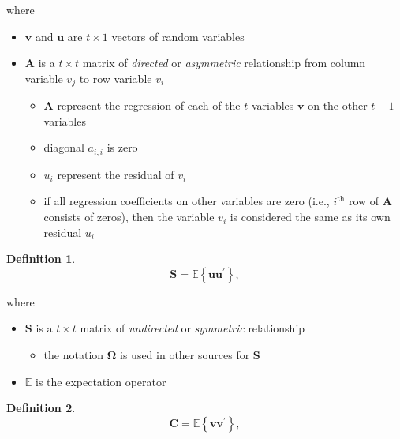 \documentclass[
]{book}
\providecommand{\tightlist}{%
  \setlength{\itemsep}{0pt}\setlength{\parskip}{0pt}}
\theoremstyle{definition}
\newtheorem{definition}{Definition}[chapter]
\theoremstyle{definition}
\theoremstyle{definition}
\theoremstyle{remark}
\begin{document}
\noindent where

\begin{itemize}
\tightlist
\item
  \(\mathbf{v}\) and \(\mathbf{u}\) are \(t \times 1\) vectors of random variables
\item
  \(\mathbf{A}\) is a \(t \times t\) matrix
  of \emph{directed} or \emph{asymmetric} relationship
  from column variable \(v_j\) to row variable \(v_i\)

  \begin{itemize}
  \tightlist
  \item
    \(\mathbf{A}\) represent the regression
    of each of the \(t\) variables \(\mathbf{v}\) on the other \(t - 1\) variables
  \item
    diagonal \(a_{i,i}\) is zero
  \item
    \(u_i\) represent the residual of \(v_i\)
  \item
    if all regression coefficients on other variables are zero
    (i.e., \(i^{\mathrm{th}}\) row of \(\mathbf{A}\) consists of zeros),
    then the variable \(v_i\) is considered the same as its own residual \(u_i\)
  \end{itemize}
\end{itemize}

\begin{definition}
\protect\hypertarget{def:unnamed-chunk-3}{}{\label{def:unnamed-chunk-3} }\begin{equation}
  \mathbf{S}
  =
  \mathbb{E}
  \left\{
    \mathbf{u} \mathbf{u}^{\prime}
  \right\} ,
\end{equation}
\end{definition}

\noindent where

\begin{itemize}
\tightlist
\item
  \(\mathbf{S}\) is a \(t \times t\) matrix
  of \emph{undirected} or \emph{symmetric} relationship

  \begin{itemize}
  \tightlist
  \item
    the notation \(\boldsymbol{\Omega}\) is used in other sources for \(\mathbf{S}\)
  \end{itemize}
\item
  \(\mathbb{E}\) is the expectation operator
\end{itemize}

\begin{definition}
\protect\hypertarget{def:unnamed-chunk-4}{}{\label{def:unnamed-chunk-4} }\begin{equation}
  \mathbf{C}
  =
  \mathbb{E}
  \left\{
    \mathbf{v} \mathbf{v}^{\prime}
  \right\} ,
\end{equation}
\end{definition}
\end{document}
